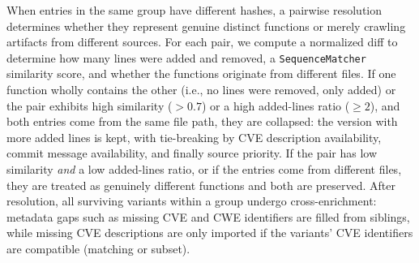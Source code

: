 \documentclass[12pt,a4paper]{article}
\begin{document}
When entries in the same group have different hashes, a pairwise resolution determines whether they represent genuine distinct functions or merely crawling artifacts from different sources. For each pair, we compute a normalized diff to determine how many lines were added and removed, a \texttt{SequenceMatcher} similarity score, and whether the functions originate from different files. If one function wholly contains the other (i.e., no lines were removed, only added) or the pair exhibits high similarity ($>0.7$) or a high added-lines ratio ($\geq 2$), and both entries come from the same file path, they are collapsed: the version with more added lines is kept, with tie-breaking by CVE description availability, commit message availability, and finally source priority. If the pair has low similarity \emph{and} a low added-lines ratio, or if the entries come from different files, they are treated as genuinely different functions and both are preserved. After resolution, all surviving variants within a group undergo cross-enrichment: metadata gaps such as missing CVE and CWE identifiers are filled from siblings, while missing CVE descriptions are only imported if the variants' CVE identifiers are compatible (matching or subset).
\end{document}
